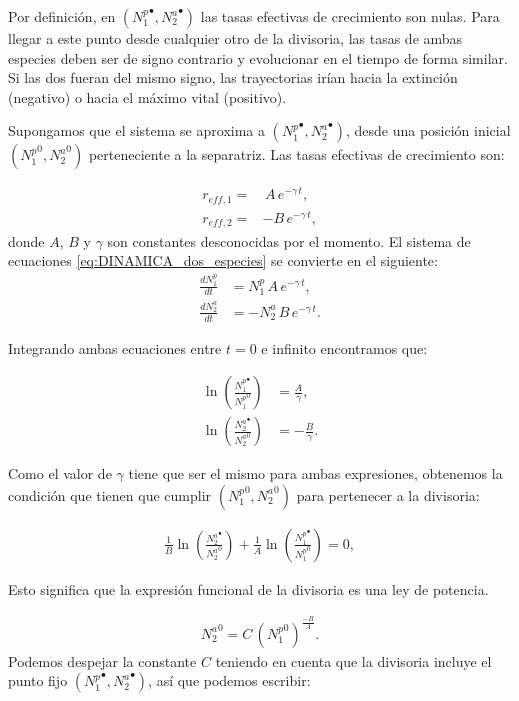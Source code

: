Por definición, en $({N_1^p}^\bullet,{N_2^a}^\bullet)$ las tasas efectivas de crecimiento son nulas. Para llegar a este punto desde cualquier otro de la divisoria, las tasas de ambas especies deben ser de signo contrario y evolucionar en el tiempo de forma similar. Si las dos fueran del mismo signo, las trayectorias irían hacia la extinción (negativo) o hacia el máximo vital (positivo). 

Supongamos que el sistema se aproxima a $({N_1^p}^\bullet,{N_2^a}^\bullet)$, desde una posición inicial $({N_1^p}^0,{N_2^a}^0)$ perteneciente a la separatriz. Las tasas efectivas de crecimiento son:

\begin{align}
r_{eff,1}  = & \, A \, e^{-\gamma\, t} ,\nonumber\\  
r_{eff,2}  = & -B\, e^{-\gamma\, t} , 
\label{eq:coeffsreffs}
\end{align}
donde $A$, $B$ y $\gamma$ son constantes desconocidas por el momento. El sistema de ecuaciones \ref{eq:DINAMICA_dos_especies} se convierte en el siguiente:
\begin{align}
\frac{dN^p_{1}}{dt} & = N^p_{1} \, A \, e^{-\gamma \, t} , \nonumber \\
\frac{dN^a_{2}}{dt} & = -N^a_{2}\, B \, e^{-\gamma \, t} .
\label{eq:coeffsreffs_2}
\end{align}

Integrando ambas ecuaciones entre $t = 0$ e infinito  encontramos que:

\begin{align}
 \ln \left(\frac{{N_1^p}^\bullet}{{N_{1}^p}^0} \right) & = \frac{A}{\gamma} , \nonumber\\ 
 \ln \left(\frac{{N_2^a}^\bullet}{{N_{2}^a}^0} \right) & = - \frac{B}{\gamma} .
\label{eq:coeffsreffs_3}
\end{align}

Como el valor de $\gamma$ tiene que ser el mismo para ambas expresiones, obtenemos la condición que tienen que cumplir $({N_1^p}^0,{N_2^a}^0)$ para pertenecer a la divisoria:

\begin{align}
\frac{1}{B} \ln \left(\frac{{N_{2}^a}^\bullet}{{N_{2}^a}^0} \right) + \frac{1}{A} \ln \left(\frac{{N_1^p}^\bullet}{{N_1^p}^0} \right) = 0 ,
\label{eq:coeffsreffs_4}
\end{align}

Esto significa que la expresión funcional de la divisoria es una ley de potencia.

\begin{align}
{N_2^a}^0 = C\, ({N_1^p}^0)^\frac{-B}{A}. 
\label{eq:powerlaw}
\end{align}
Podemos despejar la constante $C$ teniendo en cuenta que la divisoria incluye el punto fijo $({N_1^p}^\bullet,{N_2^a}^\bullet)$, así que podemos escribir:

